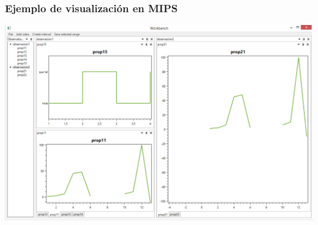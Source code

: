 \begin{frame}
	\frametitle{Ejemplo de visualizaci\'on en MIPS}
	\begin{center}
		\includegraphics[width=1.0\linewidth]{./Figures/EjemploObservacion.PNG}
	\end{center}
\end{frame}